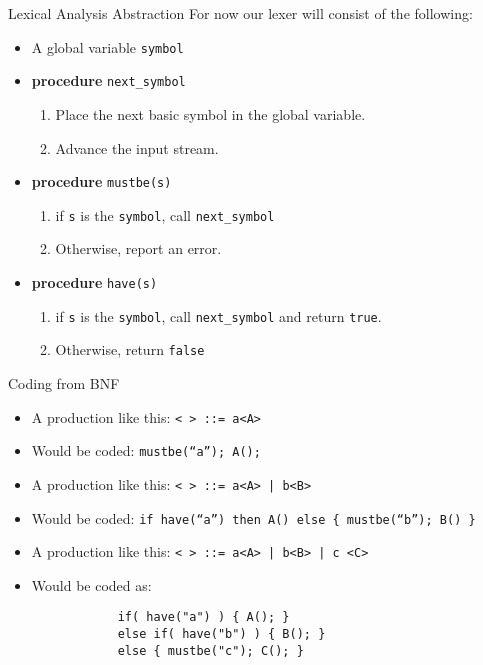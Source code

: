 \documentclass[]{beamer}
\begin{document}
\begin{frame}{Lexical Analysis Abstraction}
    For now our lexer will consist of the following:
    \begin{itemize}[<+->]
        \item A global variable \texttt{symbol}
        \item \textbf{procedure} \texttt{next\_symbol}
        \begin{enumerate}
            \item Place the next basic symbol in the global variable.
            \item Advance the input stream.
        \end{enumerate}
        \item \textbf{procedure} \texttt{mustbe(s)}
        \begin{enumerate}
            \item if \texttt{s} is the \texttt{symbol}, call
                \texttt{next\_symbol}
            \item Otherwise, report an error.
        \end{enumerate}
        \item \textbf{procedure} \texttt{have(s)}
        \begin{enumerate}
            \item if \texttt{s} is the \texttt{symbol}, call
                \texttt{next\_symbol} and return \texttt{true}.
            \item Otherwise, return \texttt{false}
        \end{enumerate}
    \end{itemize}
\end{frame}

\begin{frame}[fragile]{Coding from BNF}
    \begin{itemize}[<+->]
        \item A production like this: \texttt{< > ::= a<A>}
        \item Would be coded: 
            \newline\texttt{mustbe(``a''); A();}
        \item A production like this: \texttt{< > ::= a<A> | b<B>}
        \item Would be coded:
            \newline \texttt{if have(``a'') then A() else \{
            mustbe(``b''); B() \} }
        \item A production like this: \texttt{< > ::= a<A> | b<B> | c <C> }
        \item Would be coded as:
        \begin{verbatim}
            if( have("a") ) { A(); }
            else if( have("b") ) { B(); }
            else { mustbe("c"); C(); }
        \end{verbatim}
    \end{itemize}
\end{frame}
\end{document}
